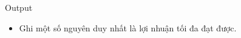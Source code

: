 Output
\begin{itemize}
	\item     Ghi một số nguyên duy nhất là lợi nhuận tối đa đạt được.   
\end{itemize}